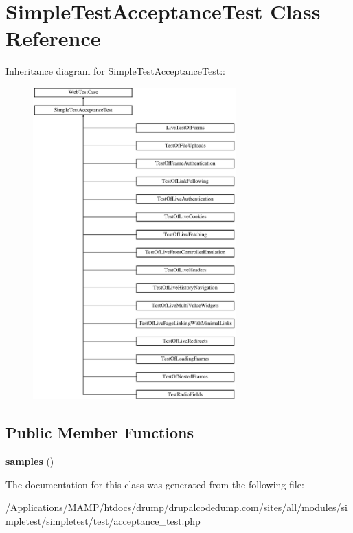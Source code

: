 \hypertarget{class_simple_test_acceptance_test}{
\section{SimpleTestAcceptanceTest Class Reference}
\label{class_simple_test_acceptance_test}
}
Inheritance diagram for SimpleTestAcceptanceTest::\begin{figure}[H]
\begin{center}
\leavevmode
\includegraphics[height=12cm]{class_simple_test_acceptance_test}
\end{center}
\end{figure}
\subsection*{Public Member Functions}
\begin{DoxyCompactItemize}
\item 
\hypertarget{class_simple_test_acceptance_test_a12e7d00bfda807bc135e15a6fa57d182}{
{\bfseries samples} ()}
\label{class_simple_test_acceptance_test_a12e7d00bfda807bc135e15a6fa57d182}

\end{DoxyCompactItemize}


The documentation for this class was generated from the following file:\begin{DoxyCompactItemize}
\item 
/Applications/MAMP/htdocs/drump/drupalcodedump.com/sites/all/modules/simpletest/simpletest/test/acceptance\_\-test.php\end{DoxyCompactItemize}
